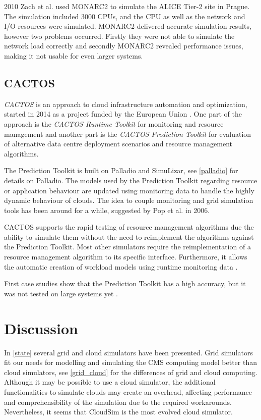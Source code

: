 2010 Zach et al. \cite{1742-6596-331-7-072038} used MONARC2 to simulate the ALICE Tier-2 site in Prague. The simulation included 3000 CPUs, and the CPU as well as the network and I/O resources were simulated. MONARC2 delivered accurate simulation results, however two problems occurred. Firstly they were not able to simulate the network load correctly and secondly MONARC2 revealed performance issues, making it not usable for even larger systems.

\section{CACTOS}
\textit{CACTOS} is an approach to cloud infrastructure automation and optimization, started in 2014 as a project funded by the European Union \cite{cactos}.
One part of the approach is the \textit{CACTOS Runtime Toolkit} for monitoring and resource management and another part is the \textit{CACTOS Prediction Toolkit} for evaluation of alternative data centre deployment scenarios and resource management algorithms.

The Prediction Toolkit is built on Palladio and SimuLizar, see \cref{palladio} for details on Palladio.
The models used by the Prediction Toolkit regarding resource or application behaviour are updated using monitoring data to handle the highly dynamic behaviour of clouds.
The idea to couple monitoring and grid simulation tools has been around for a while, suggested by Pop et al. \cite{1698650} in 2006.

CACTOS supports the rapid testing of resource management algorithms due the ability to simulate them without the need to reimplement the algorithms against the Prediction Toolkit. Most other simulators require the reimplementation of a resource management algorithm to its specific interface. Furthermore, it allows the automatic creation of workload models  using runtime monitoring data \cite{rapidtesting}.

First case studies show that the Prediction Toolkit has a high accuracy, but it was not tested on large systems yet \cite{rapidtesting}.

\chapter{Discussion}
\label{dis}
In \cref{state} several grid and cloud simulators have been presented. Grid simulators fit our needs for modelling and simulating the CMS computing model better than cloud simulators, see \cref{grid_cloud} for the differences of grid and cloud computing. Although it may be possible to use a cloud simulator, the additional functionalities to simulate clouds may create an overhead, affecting performance and comprehensibility of the simulation due to the required workarounds. Nevertheless, it seems that CloudSim is the most evolved cloud simulator.

